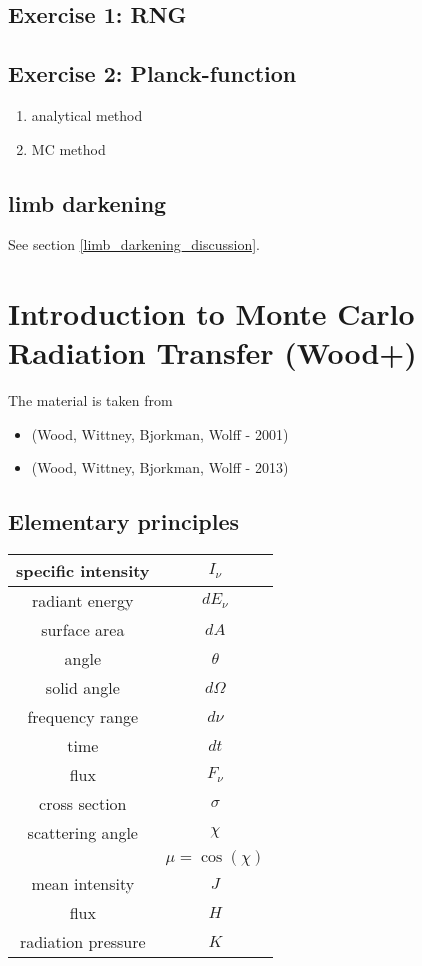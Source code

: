 \documentclass[../main/main.tex]{subfiles}
\begin{document}
\subsection{Exercise 1: RNG}
\subsection{Exercise 2: Planck-function}
\begin{enumerate}
\item analytical method
\item MC method
\end{enumerate}
\subsection{limb darkening}
See section \ref{limb_darkening_discussion}.

\newpage

\newpage
\section{Introduction to Monte Carlo Radiation Transfer (Wood+)}
The material is taken from
\begin{itemize}
\item (Wood, Wittney, Bjorkman, Wolff - 2001)
\item (Wood, Wittney, Bjorkman, Wolff - 2013)
\end{itemize}

\subsection{Elementary principles}

\begin{center}
\centering
{\tabulinesep=1.5mm
\begin{tabu}{|c|c|}
\hline 
specific intensity & $I_{\nu}$ \\ \hline
radiant energy & $dE_{\nu}$ \\ \hline
surface area & $dA$ \\ \hline
angle & $\theta$ \\ \hline
solid angle & $d \Omega$ \\ \hline
frequency range & $d \nu$ \\ \hline
time & $dt$ \\ \hline
flux & $F_{\nu}$ \\ \hline
cross section & $\sigma$ \\ \hline
scattering angle & $\chi$ \\ 
 & $\mu = \cos(\chi)$ \\ \hline
mean intensity & $J$ \\ \hline
flux & $H$ \\ \hline
radiation pressure & $K$ \\ \hline
\end{tabu}}
\end{center}
\end{document}
